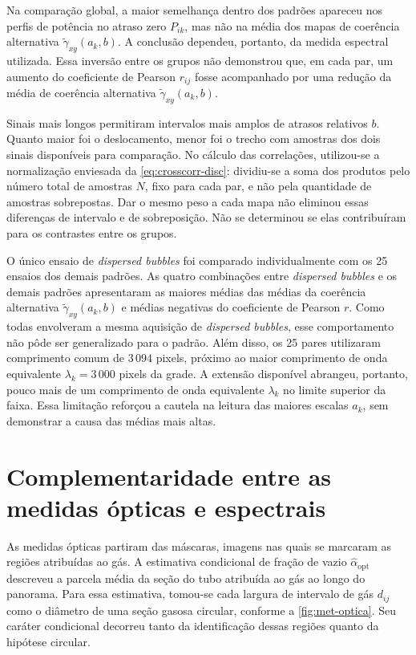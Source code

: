 Na comparação global, a maior semelhança dentro dos padrões apareceu nos
perfis de potência no atraso zero $P_{ik}$, mas não na média dos mapas de
coerência alternativa $\widetilde\gamma_{xy}(a_k,b)$. A conclusão dependeu,
portanto, da medida espectral utilizada. Essa inversão entre os grupos
não demonstrou que, em cada par, um aumento do coeficiente de
Pearson $r_{ij}$ fosse acompanhado por uma redução da média de coerência
alternativa $\widetilde\gamma_{xy}(a_k,b)$.

Sinais mais longos permitiram intervalos mais amplos de atrasos relativos
$b$. Quanto maior foi o deslocamento, menor foi o trecho com amostras dos
dois sinais disponíveis para comparação. No cálculo das correlações,
utilizou-se a normalização enviesada da \autoref{eq:crosscorr-disc}:
dividiu-se a soma dos produtos pelo número total de amostras $N$, fixo para
cada par, e não pela quantidade de amostras sobrepostas.
Dar o mesmo peso a cada mapa não eliminou essas diferenças de intervalo
e de sobreposição. Não se determinou se elas contribuíram para os
contrastes entre os grupos.

O único ensaio de \textit{dispersed bubbles} foi comparado individualmente com os
25 ensaios dos demais padrões. As quatro combinações entre \textit{dispersed bubbles}
e os demais padrões apresentaram as maiores médias das médias da coerência
alternativa $\widetilde\gamma_{xy}(a_k,b)$ e
médias negativas do coeficiente de Pearson $r$. Como todas envolveram a
mesma aquisição de \textit{dispersed bubbles}, esse comportamento não pôde ser
generalizado para o padrão. Além disso, os 25 pares utilizaram comprimento
comum de $3\,094$ pixels, próximo ao maior comprimento de onda equivalente
$\lambda_k=3\,000$ pixels da grade. A extensão disponível abrangeu, portanto,
pouco mais de um comprimento de onda equivalente $\lambda_k$ no limite
superior da faixa. Essa limitação reforçou a cautela
na leitura das maiores escalas $a_k$, sem demonstrar a causa das médias mais
altas.

\section{Complementaridade entre as medidas ópticas e espectrais}\label{sec:disc-void}

As medidas ópticas partiram das máscaras, imagens nas quais se marcaram
as regiões atribuídas ao gás. A estimativa condicional de fração de vazio
$\widehat\alpha_{\mathrm{opt}}$ descreveu a parcela média da seção do tubo
atribuída ao gás ao longo do panorama. Para essa estimativa, tomou-se cada
largura de intervalo de gás $d_{ij}$ como o diâmetro de uma seção gasosa
circular, conforme a \autoref{fig:met-optica}.
Seu caráter condicional decorreu tanto da identificação dessas regiões
quanto da hipótese circular.

